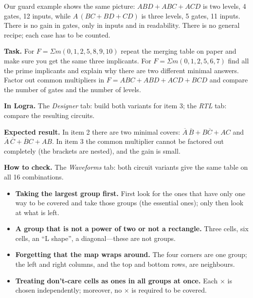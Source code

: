 Our guard example shows the same picture: $ABD+ABC+ACD$ is two levels,
4 gates, 12 inputs, while $A\,(BC+BD+CD)$ is three levels, 5 gates, 11
inputs. There is no gain in gates, only in inputs and in readability. There is
no general recipe; each case has to be counted.

\begin{diybox}
\textbf{Task.}  For $F=\Sigma m(0,1,2,5,8,9,10)$ repeat the merging
table on paper and make sure you get the same three implicants.  For
$F=\Sigma m(0,1,2,5,6,7)$ find all the prime implicants and explain why there
are two different minimal answers.  Factor out common multipliers in
$F=ABC+ABD+ACD+BCD$ and compare the number of gates and the number of levels.

\textbf{In Logra.} The \emph{Designer} tab: build both variants for item 3;
the \emph{RTL} tab: compare the resulting circuits.

\textbf{Expected result.} In item 2 there are two minimal covers:
$\overline{A}\,\overline{B}+B\overline{C}+AC$ and
$\overline{A}\,\overline{C}+\overline{B}C+AB$. In item 3 the common
multiplier cannot be factored out completely (the brackets are nested), and
the gain is small.

\textbf{How to check.} The \emph{Waveforms} tab: both circuit variants give
the same table on all 16 combinations.
\end{diybox}

\begin{warnbox}
\begin{itemize}
  \item \textbf{Taking the largest group first.} First look for the ones that
        have only one way to be covered and take those groups (the essential
        ones); only then look at what is left.
  \item \textbf{A group that is not a power of two or not a rectangle.} Three
        cells, six cells, an ``L shape'', a diagonal---these are not groups.
  \item \textbf{Forgetting that the map wraps around.} The four corners are one
        group; the left and right columns, and the top and bottom rows, are
        neighbours.
  \item \textbf{Treating don't-care cells as ones in all groups at once.}
        Each $\times$ is chosen independently; moreover, no $\times$ is
        required to be covered.
\end{itemize}
\end{warnbox}


